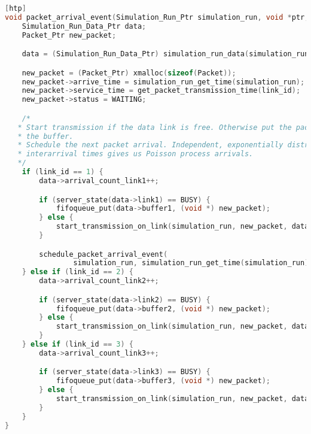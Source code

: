 \begin{lstlisting}[language=C, caption={Modifications to Experiment 5 Code}, label={list:exp5}][htp]
void packet_arrival_event(Simulation_Run_Ptr simulation_run, void *ptr, int link_id) {
    Simulation_Run_Data_Ptr data;
    Packet_Ptr new_packet;

    data = (Simulation_Run_Data_Ptr) simulation_run_data(simulation_run);

    new_packet = (Packet_Ptr) xmalloc(sizeof(Packet));
    new_packet->arrive_time = simulation_run_get_time(simulation_run);
    new_packet->service_time = get_packet_transmission_time(link_id);
    new_packet->status = WAITING;

    /*
   * Start transmission if the data link is free. Otherwise put the packet into
   * the buffer.
   * Schedule the next packet arrival. Independent, exponentially distributed
   * interarrival times gives us Poisson process arrivals.
   */
    if (link_id == 1) {
        data->arrival_count_link1++;

        if (server_state(data->link1) == BUSY) {
            fifoqueue_put(data->buffer1, (void *) new_packet);
        } else {
            start_transmission_on_link(simulation_run, new_packet, data->link1);
        }

        schedule_packet_arrival_event(
                simulation_run, simulation_run_get_time(simulation_run) + exponential_generator((double) 1 / LINK1_PACKET_ARRIVAL_RATE), 1);
    } else if (link_id == 2) {
        data->arrival_count_link2++;

        if (server_state(data->link2) == BUSY) {
            fifoqueue_put(data->buffer2, (void *) new_packet);
        } else {
            start_transmission_on_link(simulation_run, new_packet, data->link2);
        }
    } else if (link_id == 3) {
        data->arrival_count_link3++;

        if (server_state(data->link3) == BUSY) {
            fifoqueue_put(data->buffer3, (void *) new_packet);
        } else {
            start_transmission_on_link(simulation_run, new_packet, data->link3);
        }
    }
}
\end{lstlisting}


